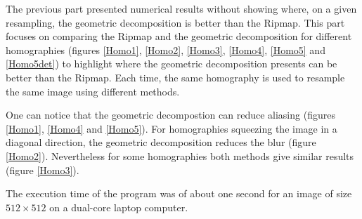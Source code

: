 

The previous part presented numerical results without showing where, on a given resampling, the geometric decomposition is better than the Ripmap. This part focuses on comparing the Ripmap and the geometric decomposition for different homographies (figures \ref{Homo1}, \ref{Homo2}, \ref{Homo3}, \ref{Homo4}, \ref{Homo5} and \ref{Homo5det}) to highlight where the geometric decomposition presents can be better than the Ripmap. Each time, the same homography is used to resample the same image using different methods.


One can notice that the geometric decompostion can reduce aliasing (figures \ref{Homo1}, \ref{Homo4} and \ref{Homo5}). For homographies squeezing the image in a diagonal direction, the geometric decomposition reduces the blur (figure \ref{Homo2}). Nevertheless for some homographies both methods give similar results (figure \ref{Homo3}).



The execution time of the program was of about one second for an image of size $512\times 512$ on a dual-core laptop computer.


